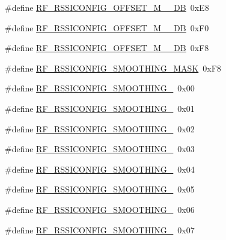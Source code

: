 \begin{DoxyCompactItemize}
\item 
\#define \mbox{\hyperlink{sx1276_regs-_fsk_8h_a931a618c3206621f7a13ed8e2b7dfc85}{R\+F\+\_\+\+R\+S\+S\+I\+C\+O\+N\+F\+I\+G\+\_\+\+O\+F\+F\+S\+E\+T\+\_\+\+M\+\_\+\_\+\+DB}}~0x\+E8
\item 
\#define \mbox{\hyperlink{sx1276_regs-_fsk_8h_a07f627585a0fb052af36c054b1aa998d}{R\+F\+\_\+\+R\+S\+S\+I\+C\+O\+N\+F\+I\+G\+\_\+\+O\+F\+F\+S\+E\+T\+\_\+\+M\+\_\+\_\+\+DB}}~0x\+F0
\item 
\#define \mbox{\hyperlink{sx1276_regs-_fsk_8h_a1bda3872a2df71ff4834111e75210880}{R\+F\+\_\+\+R\+S\+S\+I\+C\+O\+N\+F\+I\+G\+\_\+\+O\+F\+F\+S\+E\+T\+\_\+\+M\+\_\+\_\+\+DB}}~0x\+F8
\item 
\#define \mbox{\hyperlink{sx1276_regs-_fsk_8h_a8ff6402df6371ff0d43d3cc044cd24ae}{R\+F\+\_\+\+R\+S\+S\+I\+C\+O\+N\+F\+I\+G\+\_\+\+S\+M\+O\+O\+T\+H\+I\+N\+G\+\_\+\+M\+A\+SK}}~0x\+F8
\item 
\#define \mbox{\hyperlink{sx1276_regs-_fsk_8h_ab42a5844e4a21615cbe58162237dd17f}{R\+F\+\_\+\+R\+S\+S\+I\+C\+O\+N\+F\+I\+G\+\_\+\+S\+M\+O\+O\+T\+H\+I\+N\+G\+\_}}~0x00
\item 
\#define \mbox{\hyperlink{sx1276_regs-_fsk_8h_af10e6a0d1b88f5750047c1a87c5cdd7c}{R\+F\+\_\+\+R\+S\+S\+I\+C\+O\+N\+F\+I\+G\+\_\+\+S\+M\+O\+O\+T\+H\+I\+N\+G\+\_}}~0x01
\item 
\#define \mbox{\hyperlink{sx1276_regs-_fsk_8h_a3edb9e3f6851690fc218c719ca858763}{R\+F\+\_\+\+R\+S\+S\+I\+C\+O\+N\+F\+I\+G\+\_\+\+S\+M\+O\+O\+T\+H\+I\+N\+G\+\_}}~0x02
\item 
\#define \mbox{\hyperlink{sx1276_regs-_fsk_8h_a796004e51661fdbde6d228017452dbfe}{R\+F\+\_\+\+R\+S\+S\+I\+C\+O\+N\+F\+I\+G\+\_\+\+S\+M\+O\+O\+T\+H\+I\+N\+G\+\_}}~0x03
\item 
\#define \mbox{\hyperlink{sx1276_regs-_fsk_8h_af3544ebacc23f2f0da15339288abd88b}{R\+F\+\_\+\+R\+S\+S\+I\+C\+O\+N\+F\+I\+G\+\_\+\+S\+M\+O\+O\+T\+H\+I\+N\+G\+\_}}~0x04
\item 
\#define \mbox{\hyperlink{sx1276_regs-_fsk_8h_aae348ea0ba017e4bc7ce0ad98205a9a6}{R\+F\+\_\+\+R\+S\+S\+I\+C\+O\+N\+F\+I\+G\+\_\+\+S\+M\+O\+O\+T\+H\+I\+N\+G\+\_}}~0x05
\item 
\#define \mbox{\hyperlink{sx1276_regs-_fsk_8h_a65690fc4263834d89464b781dfbf0abe}{R\+F\+\_\+\+R\+S\+S\+I\+C\+O\+N\+F\+I\+G\+\_\+\+S\+M\+O\+O\+T\+H\+I\+N\+G\+\_}}~0x06
\item 
\#define \mbox{\hyperlink{sx1276_regs-_fsk_8h_ab1e32dfa6c5a4e8707b17a39d4c952f2}{R\+F\+\_\+\+R\+S\+S\+I\+C\+O\+N\+F\+I\+G\+\_\+\+S\+M\+O\+O\+T\+H\+I\+N\+G\+\_}}~0x07

\end{DoxyCompactItemize}
